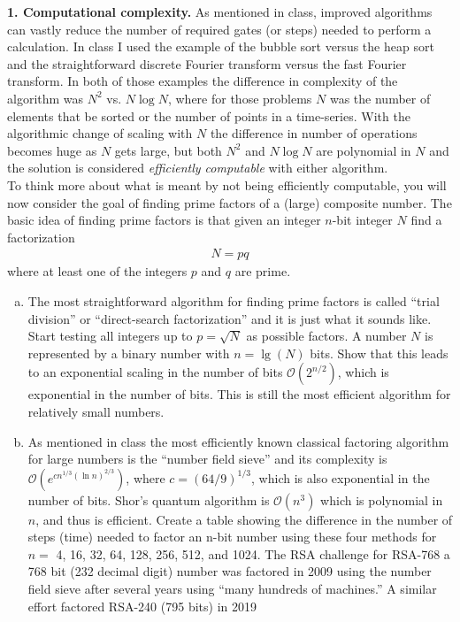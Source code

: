 \documentclass{book}
\theoremstyle{definition}
\newcommand{\lp}{\left(}
\newcommand{\rp}{\right)}
\begin{document}
\noindent \textbf{1. Computational complexity.}  As mentioned in class, improved algorithms can vastly reduce
the number of required gates (or steps) needed to perform a calculation. In class I used the
example of the bubble sort versus the heap sort and the straightforward discrete Fourier
transform versus the fast Fourier transform. In both of those examples the difference in
complexity of the algorithm was $N^2$ vs. $N \log N$, where for those problems $N$ was the number
of elements that be sorted or the number of points in a time-series. With the algorithmic
change of scaling with $N$ the difference in number of operations becomes huge as $N$ gets
large, but both $N^2$ and $N \log N$ are polynomial in $N$ and the solution is considered \textit{efficiently
computable} with either algorithm.
\\

To think more about what is meant by not being efficiently computable, you will now consider
the goal of finding prime factors of a (large) composite number. The basic idea of finding
prime factors is that given an integer $n$-bit integer $N$ find a factorization
\begin{align}
N = pq
\end{align}
where at least one of the integers $p$ and $q$ are prime.
\begin{enumerate}[(a)]
	\item The most straightforward algorithm for finding prime factors is called ``trial division'' or
	``direct-search factorization'' and it is just what it sounds like. Start testing all integers
	up to $p = \sqrt{N}$ as possible factors. A number $N$ is represented by a binary number
	with $n = \lg(N)$ bits. Show that this leads to an exponential scaling in the number of
	bits $\mathcal{O}(2^{n/2})$, which is exponential in the number of bits. This is still the most efficient algorithm for relatively small numbers.
	\item  As mentioned in class the most efficiently known classical factoring algorithm for large
	numbers is the ``number field sieve'' and its complexity is $\mathcal{O}\lp e^{cn^{1/3}(\ln n )^{2/3}}  \rp$, where $c =
	(64/9)^{1/3}$, which is also exponential in the number of bits. Shor’s quantum algorithm is $\mathcal{O}(n^3)$ which is polynomial in $n$, and thus is efficient. Create a table showing the
	difference in the number of steps (time) needed to factor an n-bit number using these
	four methods for $n =$ 4, 16, 32, 64, 128, 256, 512, and 1024. The RSA challenge for RSA-768 a 768 bit (232 decimal digit) number was factored in
	2009 using the number field sieve after several years using ``many hundreds of machines.''
	A similar effort factored RSA-240 (795 bits) in 2019
\end{enumerate}
\end{document}
